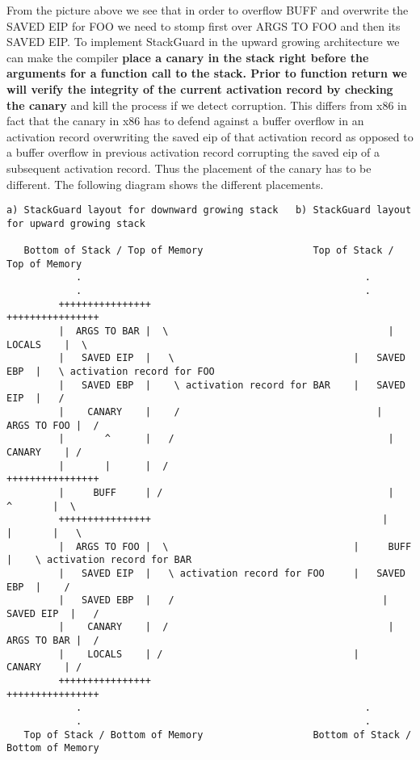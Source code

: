 \noindent From the picture above we see that in order to overflow BUFF and overwrite the SAVED EIP for FOO we need to stomp first over ARGS TO FOO and then its SAVED EIP. To implement StackGuard in the upward growing architecture we can make the compiler \textbf{place a canary in the stack right before the arguments for a function call to the stack. Prior to function return we will verify the integrity of the current activation record by checking the canary} and kill the process if we detect corruption. 
This differs from x86 in fact that the canary in x86 has to defend against a buffer overflow in an activation record overwriting the saved eip of that activation record as opposed to a buffer overflow in previous activation record corrupting the saved eip of a subsequent activation record. Thus the placement of the canary has to be different. The following diagram shows the different placements.
\begin{verbatim}
a) StackGuard layout for downward growing stack   b) StackGuard layout for upward growing stack 

   Bottom of Stack / Top of Memory                   Top of Stack / Top of Memory
            .                                                 .
            .                                                 .
 		 ++++++++++++++++ 		                                 ++++++++++++++++
 		 |  ARGS TO BAR |  \ 		                              |    LOCALS    |  \
 		 |   SAVED EIP  |   \  	                            |   SAVED EBP  |   \ activation record for FOO
 		 |   SAVED EBP  |    \ activation record for BAR    |   SAVED EIP  |   /
 		 |    CANARY    |    / 		                            |  ARGS TO FOO |  /
 		 |       ^      |   / 	  		                          |    CANARY    | /
 		 |       |      |  /  		                             ++++++++++++++++
 		 |     BUFF     | /	     		                          |      ^       |  \
 		 ++++++++++++++++ 		                                 |      |       |   \
 		 |  ARGS TO FOO |  \                                |     BUFF     |    \ activation record for BAR  
 		 |   SAVED EIP  |   \ activation record for FOO     |   SAVED EBP  |    /  
 		 |   SAVED EBP  |   / 		                             |   SAVED EIP  |   /
 		 |    CANARY    |  / 		                              |  ARGS TO BAR |  /
 		 |    LOCALS    | /	                           	    |    CANARY    | /
 		 ++++++++++++++++ 	                            	    ++++++++++++++++
            .                                                 .
            .                                                 .
   Top of Stack / Bottom of Memory                   Bottom of Stack / Bottom of Memory
\end{verbatim}

